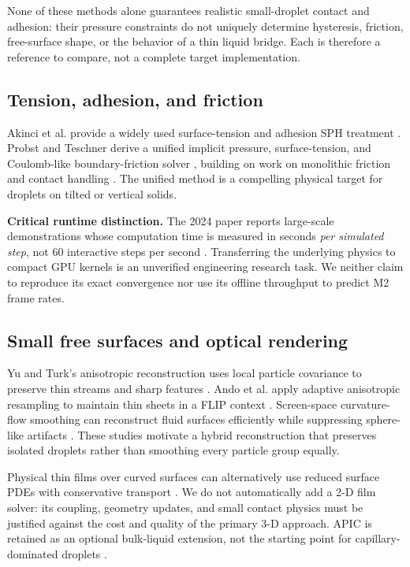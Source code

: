 \documentclass[10pt,a4paper]{article}
\begin{document}
None of these methods alone guarantees realistic small-droplet contact and adhesion: their pressure constraints do not uniquely determine hysteresis, friction, free-surface shape, or the behavior of a thin liquid bridge. Each is therefore a reference to compare, not a complete target implementation.

\subsection{Tension, adhesion, and friction}
Akinci et al. provide a widely used surface-tension and adhesion SPH treatment \citep{akinci2013}. Probst and Teschner derive a unified implicit pressure, surface-tension, and Coulomb-like boundary-friction solver \citep{probst2024}, building on work on monolithic friction and contact handling \citep{probst2023}. The unified method is a compelling physical target for droplets on tilted or vertical solids.

\textbf{Critical runtime distinction.} The 2024 paper reports large-scale demonstrations whose computation time is measured in seconds \emph{per simulated step}, not $60$ interactive steps per second \citep{probst2024}. Transferring the underlying physics to compact GPU kernels is an unverified engineering research task. We neither claim to reproduce its exact convergence nor use its offline throughput to predict M2 frame rates.

\subsection{Small free surfaces and optical rendering}
Yu and Turk's anisotropic reconstruction uses local particle covariance to preserve thin streams and sharp features \citep{yuturk2010}. Ando et al. apply adaptive anisotropic resampling to maintain thin sheets in a FLIP context \citep{ando2012}. Screen-space curvature-flow smoothing can reconstruct fluid surfaces efficiently while suppressing sphere-like artifacts \citep{vanderlaan2009}. These studies motivate a hybrid reconstruction that preserves isolated droplets rather than smoothing every particle group equally.

Physical thin films over curved surfaces can alternatively use reduced surface PDEs with conservative transport \citep{vantzos2017}. We do not automatically add a 2-D film solver: its coupling, geometry updates, and small contact physics must be justified against the cost and quality of the primary 3-D approach. APIC is retained as an optional bulk-liquid extension, not the starting point for capillary-dominated droplets \citep{jiang2015}.
\end{document}

